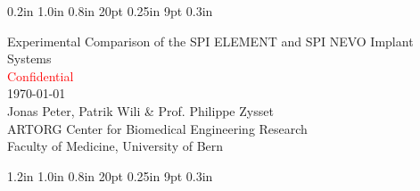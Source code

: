 \documentclass[12pt, a4paper, twoside]{report}
\begin{document}
\frontmatter
\setmarginsrb  {1.0in}  %
                        { 0.2in}  %
                        { 1.0in}  %
                        { 0.8in}  %
                        {  20pt}  %
                        {0.25in}  %
                        {   9pt}  %
                        { 0.3in}  %

\begin{titlepage}

  \hfill
{}

\begin{center}

\vspace*{3cm}
\vspace*{1cm}
{\LARGE {Experimental Comparison of the SPI ELEMENT and SPI NEVO Implant Systems}} \\
\vspace*{1cm}
\large {\textcolor{red}{Confidential}} \\ 
\vspace*{4cm}
\today\\
\vspace*{1cm}
{Jonas Peter, Patrik Wili \& Prof. Philippe Zysset}  \\
\vspace*{1.5cm}
\large{ARTORG Center for Biomedical Engineering Research}\\
\large {Faculty of Medicine, University of Bern} \\
\vspace*{0.8cm}

\end{center}
\end{titlepage}

\setmarginsrb  {1.0in}  %
                        { 1.2in}  %
                        { 1.0in}  %
                        { 0.8in}  %
                        {  20pt}  %
                        {0.25in}  %
                        {   9pt}  %
                        { 0.3in}  %
\end{document}
